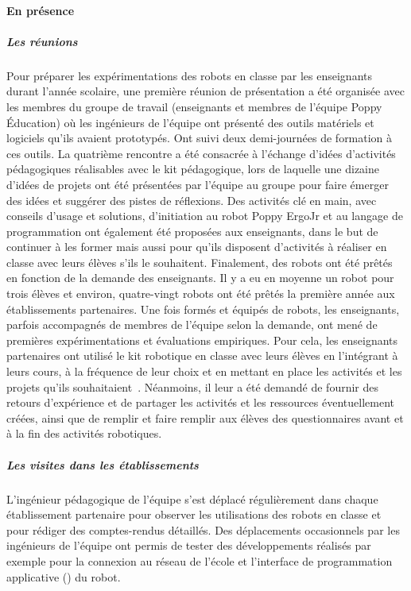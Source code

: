        \paragraph{En présence}\label{sec:reunion}
            \subparagraph{Les réunions}
                Pour préparer les expérimentations des robots en classe par les enseignants durant l'année scolaire, une première réunion de présentation a été organisée avec les membres du groupe de travail (enseignants et membres de l’équipe Poppy Éducation) où les ingénieurs de l'équipe ont présenté des outils matériels et logiciels qu'ils avaient prototypés. Ont suivi deux demi-journées de formation à ces outils. 
                La quatrième rencontre a été consacrée à l'échange d'idées d'activités pédagogiques réalisables avec le kit pédagogique, lors de laquelle une dizaine d'idées de projets ont été présentées par l'équipe au groupe pour faire émerger des idées et suggérer des pistes de réflexions. 
                Des activités clé en main, avec conseils d’usage et solutions, d’initiation au robot Poppy ErgoJr et au langage de programmation  ont également été proposées aux enseignants, dans le but de continuer à les former mais aussi pour qu’ils disposent d’activités à réaliser en classe avec leurs élèves s'ils le souhaitent.
                Finalement, des robots ont été prêtés en fonction de la demande des enseignants. Il y a eu en moyenne un robot pour trois élèves et environ, quatre-vingt robots ont été prêtés la première année aux établissements partenaires.
                Une fois formés et équipés de robots, les enseignants, parfois accompagnés de membres de l’équipe selon la demande, ont mené de premières expérimentations et évaluations empiriques. Pour cela, les enseignants partenaires ont utilisé le kit robotique en classe avec leurs élèves en l'intégrant à leurs cours, à la fréquence de leur choix et en mettant en place les activités et les projets qu'ils souhaitaient~. Néanmoins, il leur a été demandé de fournir des retours d'expérience et de partager les activités et les ressources éventuellement créées, ainsi que de remplir et faire remplir aux élèves des questionnaires avant et à la fin des activités robotiques.
            \subparagraph{Les visites dans les établissements}
                L'ingénieur pédagogique de l'équipe s'est déplacé régulièrement dans chaque établissement partenaire pour observer les utilisations des robots en classe et pour rédiger des comptes-rendus détaillés.
                Des déplacements occasionnels par les ingénieurs de l'équipe ont permis de tester des développements réalisés par exemple pour la connexion au réseau de l'école et l'interface de programmation applicative () du robot.
